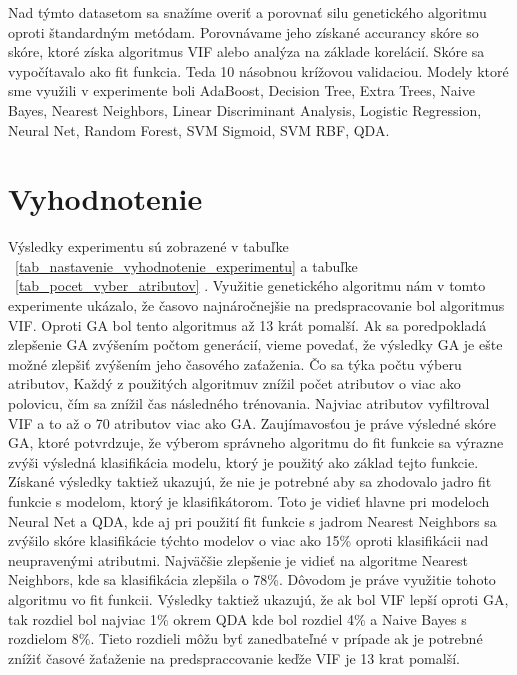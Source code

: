 \documentclass[runningheads]{llncs}
\begin{document}
Nad týmto datasetom sa snažíme overiť a porovnať silu genetického algoritmu oproti štandardným metódam. Porovnávame 
jeho získané accurancy skóre so skóre, ktoré získa algoritmus VIF alebo analýza na základe korelácií. Skóre sa 
vypočítavalo ako fit funkcia. Teda 10 násobnou krížovou validaciou. Modely ktoré sme využili v experimente boli 
AdaBoost, Decision Tree, Extra Trees, Naive Bayes, Nearest Neighbors, Linear Discriminant Analysis, 
Logistic Regression, Neural Net, Random Forest, SVM Sigmoid, SVM RBF, QDA.

\section{Vyhodnotenie}

Výsledky experimentu sú zobrazené v tabuľke ~\ref{tab_nastavenie_vyhodnotenie_experimentu} 
a tabuľke ~\ref{tab_pocet_vyber_atributov} . Využitie genetického algoritmu
nám v tomto experimente ukázalo, že časovo najnáročnejšie na predspracovanie bol algoritmus 
VIF. Oproti GA bol tento algoritmus až 13 krát pomalší. Ak sa poredpokladá 
zlepšenie GA zvýšením počtom generácií, vieme povedať, že výsledky GA je ešte možné zlepšiť 
zvýšením jeho časového zaťaženia. Čo sa týka počtu výberu atributov, Každý z 
použitých algoritmuv znížil počet atributov o viac ako polovicu, čím sa znížil čas následného 
trénovania. Najviac atributov vyfiltroval VIF a to až o 70 atributov viac ako GA. 
Zaujímavosťou je práve výsledné skóre GA, ktoré potvrdzuje, že výberom správneho algoritmu 
do fit funkcie sa výrazne zvýši výsledná klasifikácia modelu, ktorý je použitý
ako základ tejto funkcie. Získané výsledky taktiež ukazujú, že nie je potrebné aby sa 
zhodovalo jadro fit funkcie s modelom, ktorý je klasifikátorom. Toto je vidieť 
hlavne pri modeloch Neural Net a QDA, kde aj pri použití fit funkcie s jadrom 
Nearest Neighbors sa zvýšilo skóre klasifikácie týchto modelov o viac ako 15\% oproti 
klasifikácii nad neupravenými atributmi. Najväčšie zlepšenie je vidieť na algoritme 
Nearest Neighbors, kde sa klasifikácia zlepšila o 78\%. Dôvodom je práve využitie tohoto algoritmu vo fit funkcii.
Výsledky taktiež ukazujú, že ak bol VIF lepší oproti GA, tak rozdiel bol najviac 1\% okrem QDA 
kde bol rozdiel 4\% a Naive Bayes s rozdielom 8\%. Tieto rozdieli môžu byť zanedbateľné v prípade ak
je potrebné znížiť časové žaťaženie na predspraccovanie keďže VIF je 13 krat pomalší.
\end{document}
